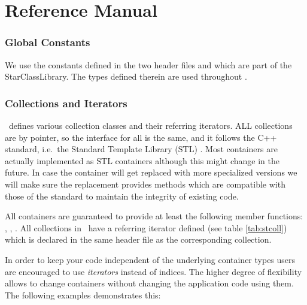 \clearpage

%
%
\part{Reference Manual}
\label{refman}
\clearpage


\section{Global Constants}

We use the constants defined in the two header files
  and
 which are part of the StarClassLibrary.
The types defined therein are used
throughout \StMcEvent .


\section{Collections and Iterators}
\label{sec:collections}
\StMcEvent\ defines various collection classes and their referring
iterators.  ALL collections are by pointer, so the interface for all is the
same, and it follows the C++
standard, i.e.~the Standard Template Library (STL) . Most
containers are actually implemented as STL containers although this
might change in the future. In case the container will get replaced with more
specialized versions we will
make sure the replacement provides methods which are compatible with those
of the standard to maintain the integrity of existing code.

All containers are guaranteed to provide at least the following member functions:
, , .  All collections in
\StMcEvent\ have a referring iterator defined (see table \ref{tab:stcoll})
which is declared in the same header file as the
corresponding collection.

In order to keep your code independent of the underlying container
types users are encouraged to use \textit{iterators} instead of
indices. The higher degree of flexibility allows to change containers
without changing the application code using them. The following
examples demonstrates this:

